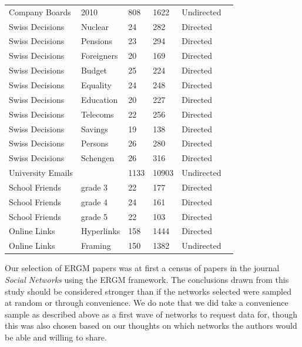 \documentclass[
]{statsoc}
\begin{document}
\begin{table}
\begin{tabular}[t]{lllllr}
Company Boards & 2010 & 808 & 1622 & Undirected & \cite{Gygax2015}\\
\addlinespace
\rowcolor{gray!6}  Swiss Decisions & Nuclear & 24 & 282 & Directed & \cite{Fischer2015}\\
Swiss Decisions & Pensions & 23 & 294 & Directed & \cite{Fischer2015}\\
\rowcolor{gray!6}  Swiss Decisions & Foreigners & 20 & 169 & Directed & \cite{Fischer2015}\\
Swiss Decisions & Budget & 25 & 224 & Directed & \cite{Fischer2015}\\
\rowcolor{gray!6}  Swiss Decisions & Equality & 24 & 248 & Directed & \cite{Fischer2015}\\
Swiss Decisions & Education & 20 & 227 & Directed & \cite{Fischer2015}\\
\rowcolor{gray!6}  Swiss Decisions & Telecoms & 22 & 256 & Directed & \cite{Fischer2015}\\
Swiss Decisions & Savings & 19 & 138 & Directed & \cite{Fischer2015}\\
\rowcolor{gray!6}  Swiss Decisions & Persons & 26 & 280 & Directed & \cite{Fischer2015}\\
Swiss Decisions & Schengen & 26 & 316 & Directed & \cite{Fischer2015}\\
\addlinespace
\rowcolor{gray!6}  University Emails &  & 1133 & 10903 & Undirected & \cite{Toivonen2009}\\
\addlinespace
School Friends & grade 3 & 22 & 177 & Directed & \cite{Anderson1999}\\
\rowcolor{gray!6}  School Friends & grade 4 & 24 & 161 & Directed & \cite{Anderson1999}\\
School Friends & grade 5 & 22 & 103 & Directed & \cite{Anderson1999}\\
\addlinespace
\rowcolor{gray!6}  Online Links & Hyperlinks & 158 & 1444 & Directed & \cite{Ackland2011}\\
Online Links & Framing & 150 & 1382 & Undirected & \cite{Ackland2011}\\
\bottomrule
\end{tabular}
\end{table}

Our selection of ERGM papers was at first a census of papers in the
journal \textit{ Social Networks} using the ERGM framework. The
conclusions drawn from this study should be considered stronger than if
the networks selected were sampled at random or through convenience. We
do note that we did take a convenience sample as described above as a
first wave of networks to request data for, though this was also chosen
based on our thoughts on which networks the authors would be able and
willing to share.
\end{document}
